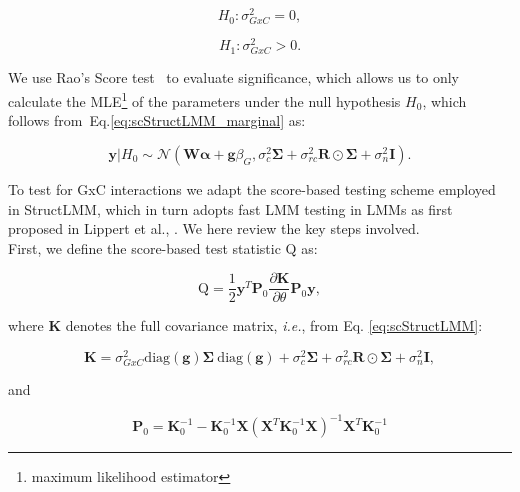 \begin{equation*}
    H_0: \sigma_{GxC}^2 = 0,
\end{equation*}

\begin{equation*}
    H_1: \sigma_{GxC}^2 > 0.
\end{equation*}

We use Rao's Score test~\cite{rao1948large} to evaluate significance, which allows us to only calculate the MLE\footnote{maximum likelihood estimator} of the parameters under the null hypothesis $H_0$, which follows from~Eq.\eqref{eq:scStructLMM_marginal} as:

\begin{equation}\label{eq:scStructLMM_H0_MVN}
 \mathbf{y}|H_0 \sim \mathcal{N}( \mathbf{W}\boldsymbol{\alpha} + \mathbf{g}\beta_G, \sigma_c^2 \boldsymbol{\Sigma} + \sigma_{rc}^2 \mathbf{R} \odot \boldsymbol{\Sigma}+ \sigma_n^2 \mathbf{I} ). 
\end{equation}

To test for GxC interactions we adapt the score-based testing scheme employed in StructLMM, which in turn adopts fast LMM testing in LMMs as first proposed in Lippert et al., \cite{lippert2011fast}.
We here review the key steps involved.
\\

First, we define the score-based test statistic $\mathrm{Q}$ as:

\begin{equation}\label{eq:Q}
    \mathrm{Q} = \frac{1}{2}\mathbf{y}^T\mathbf{P}_0 \frac{\partial \mathbf{K}}{\partial \theta}\mathbf{P}_0 \mathbf{y}, 
\end{equation}

where $\mathbf{K}$ denotes the full covariance matrix, \textit{i.e.}, from Eq. \eqref{eq:scStructLMM}:

\begin{equation}\label{eq:full_K_scStructLMM}
    \mathbf{K} = \sigma_{GxC}^2\mathrm{diag}(\mathbf{g})\boldsymbol{\Sigma} \ \mathrm{diag}(\mathbf{g}) +  \sigma_c^2 \boldsymbol{\Sigma} + \sigma_{rc}^2 \mathbf{R}\odot\boldsymbol{\Sigma}+ \sigma_n^2 \mathbf{I},
\end{equation}

and 

\begin{equation}
    \mathbf{P}_0 = \mathbf{K}_0^{-1}-\mathbf{K}_0^{-1}\mathbf{X}(\mathbf{X}^T\mathbf{K}_0^{-1}\mathbf{X})^{-1}\mathbf{X}^T\mathbf{K}_0^{-1}
\end{equation}

